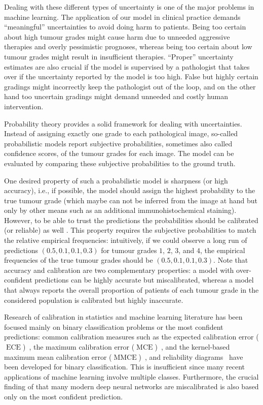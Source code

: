 \documentclass{article}
\DeclareMathOperator{\ECE}{ECE}
\DeclareMathOperator{\MCE}{MCE}
\DeclareMathOperator{\MMCE}{MMCE}
\begin{document}
Dealing with these different types of uncertainty is one of the major problems in
machine learning. The application of our model in clinical practice demands
\enquote{meaningful} uncertainties to avoid doing harm to patients. Being too
certain about high tumour grades might cause harm due to unneeded aggressive
therapies and overly pessimistic prognoses, whereas being too certain about low
tumour grades might result in insufficient therapies. \enquote{Proper}
uncertainty estimates are also crucial if the model is supervised by a
pathologist that takes over if the uncertainty reported by the model is too high.
False but highly certain gradings might incorrectly keep the pathologist out of
the loop, and on the other hand too uncertain gradings might demand unneeded and
costly human intervention.

Probability theory provides a solid framework for dealing with uncertainties.
Instead of assigning exactly one grade to each pathological image, so-called
probabilistic models report subjective probabilities, sometimes also called
confidence scores, of the tumour grades for each image. The model can be
evaluated by comparing these subjective probabilities to the ground truth.

One desired property of such a probabilistic model is sharpness (or high
accuracy), i.e., if possible, the model should assign the highest probability to
the true tumour grade (which maybe can not be inferred from the image at hand
but only by other means such as an additional immunohistochemical staining).
However, to be able to trust the predictions the probabilities should be
calibrated (or reliable) as well
\citep{murphy77_reliab_subjec_probab_forec_precip_temper,degroot83_compar_evaluat_forec}.
This property requires the subjective probabilities to match the relative
empirical frequencies: intuitively, if we could observe a long run of
predictions $(0.5, 0.1, 0.1, 0.3)$ for tumour grades $1$, $2$, $3$, and $4$, the
empirical frequencies of the true tumour grades should be
$(0.5, 0.1, 0.1, 0.3)$. Note that accuracy and calibration are two complementary
properties: a model with over-confident predictions can be highly accurate but
miscalibrated, whereas a model that always reports the overall proportion of
patients of each tumour grade in the considered population is calibrated but
highly inaccurate.

Research of calibration in statistics and machine learning literature has been
focused mainly on binary classification problems or the most confident
predictions: common calibration measures such as the expected calibration error
($\ECE$)~\citep{naeini15_obtain_bayes}, the maximum calibration error
($\MCE$)~\citep{naeini15_obtain_bayes}, and the kernel-based maximum mean
calibration error ($\MMCE$)~\citep{kumar18_train_calib_measur_neural_networ},
and reliability
diagrams~\citep{murphy77_reliab_subjec_probab_forec_precip_temper} have been
developed for binary classification. This is insufficient since many recent
applications of machine learning involve multiple classes. Furthermore, the
crucial finding of \citet{guo17_calib_moder_neural_networ} that many modern deep
neural networks are miscalibrated is also based only on the most confident
prediction.
\end{document}
